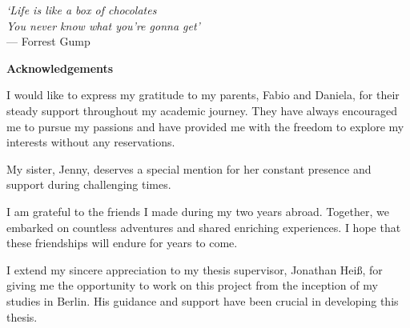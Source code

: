 \thispagestyle{empty}

\begin{flushright}
    \textsl{`Life is like a box of chocolates\\You never know what you're gonna get'}
    \\
    \medskip
    --- Forrest Gump
\end{flushright}


\bigskip

\begin{center}
    \textbf{Acknowledgements}
\end{center}

\noindent I would like to express my gratitude to my parents, Fabio and Daniela, for their steady support throughout my academic journey. They have always encouraged me to pursue my passions and have provided me with the freedom to explore my interests without any reservations.

\noindent My sister, Jenny, deserves a special mention for her constant presence and support during challenging times.

\noindent I am grateful to the friends I made during my two years abroad. Together, we embarked on countless adventures and shared enriching experiences. I hope that these friendships will endure for years to come.

\noindent I extend my sincere appreciation to my thesis supervisor, Jonathan Heiß, for giving me the opportunity to work on this project from the inception of my studies in Berlin. His guidance and support have been crucial in developing this thesis.
